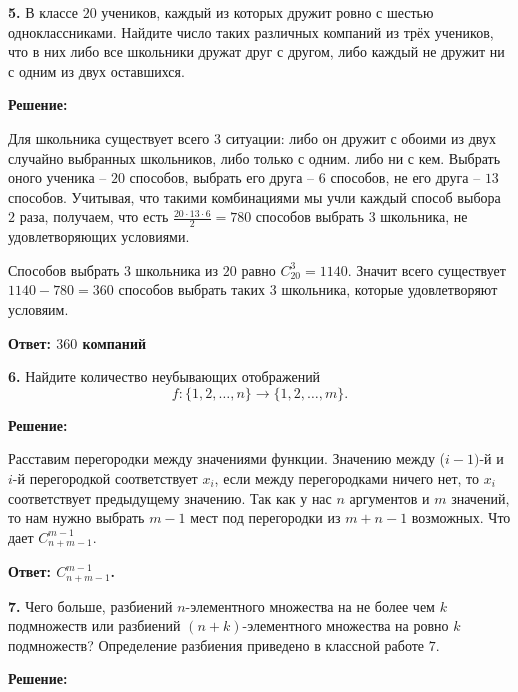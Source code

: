 \documentclass[a4paper,12pt]{article} %
\begin{document}
{\bf 5.} В классе $20$ учеников, каждый из которых дружит ровно с шестью
одноклассниками. Найдите число таких различных компаний из трёх
учеников, что в них либо все школьники дружат друг с другом, либо
каждый не дружит ни с одним из двух оставшихся.
\begin{center}
\bfseries
{\Large Решение: }
\end{center}

Для школьника существует всего $3$ ситуации: либо он дружит с обоими из двух случайно выбранных школьников, либо только с одним. либо ни с кем. Выбрать оного ученика -- $20$ способов, выбрать его друга -- $6$ способов, не его друга -- $13$ способов. Учитывая, что такими комбинациями мы учли каждый способ выбора $2$ раза, получаем, что есть $\frac{20 \cdot 13 \cdot 6}{2} = 780$ способов выбрать $3$ школьника, не удовлетворяющих условиями.

Способов выбрать $3$ школьника из $20$ равно $C^3_{20} = 1140$. Значит всего существует $1140-780 = 360$ способов выбрать таких $3$ школьника, которые удовлетворяют условяим.


\begin{flushright}
\begin{large}
\textbf {Ответ:  $360$ компаний}
\end{large}
\end{flushright}

{\bf 6.} Найдите количество неубывающих отображений \[f : \{ 1,2,\dots , n\} \rightarrow \{ 1,2,\dots ,m\}. \] 
\begin{center}
\bfseries
{\Large Решение: }
\end{center}

Расставим перегородки между значениями функции. Значению между ($i-1)$-й и $i$-й перегородкой соответствует $x_i$, если между перегородками ничего нет, то $x_i$ соответствует предыдущему значению. Так как у нас $n$ аргументов и $m$ значений, то нам нужно выбрать $m-1$ мест под
перегородки из $m + n-1$ возможных. Что дает $C_{n+m-1}^{m-1}$.

\begin{flushright}
\begin{large}
\textbf {Ответ: $C_{n+m-1}^{m-1}$.}
\end{large}
\end{flushright}


{\bf 7.} Чего больше, разбиений $n$-элементного множества на не более чем $k$ подмножеств или разбиений $(n + k)$-элементного множества на ровно $k$
подмножеств? Определение разбиения приведено в классной работе $7$.
\begin{center}
\bfseries
{\Large Решение: }
\end{center}
\end{document}
